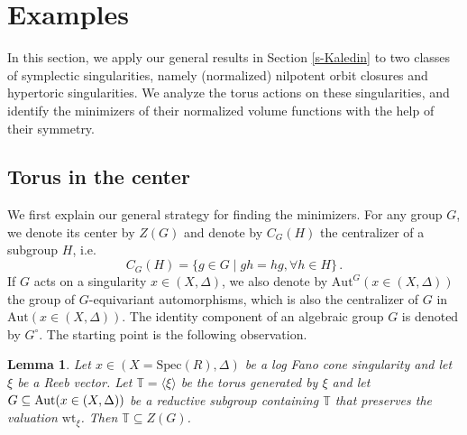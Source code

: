 \documentclass[12pt]{amsart}
\newtheorem{cor}[prop]{Corollary}
\newtheorem{lem}[prop]{Lemma}
\theoremstyle{definition}
\newcommand{\bT}{\mathbb{T}}
\newcommand{\Spec}{\mathrm{Spec}}
\newcommand{\Aut}{\mathrm{Aut}}
\newcommand{\wt}{\mathrm{wt}}
\numberwithin{equation}{section}
\begin{document}



\section{Examples}\label{s-open}

In this section, we apply our general results in Section \ref{s-Kaledin} to two classes of symplectic singularities, namely (normalized) nilpotent orbit closures and hypertoric singularities. We analyze the torus actions on these singularities, and identify the minimizers of their normalized volume functions with the help of their symmetry.

\subsection{Torus in the center}

We first explain our general strategy for finding the minimizers. For any group $G$, we denote its center by $Z(G)$ and denote by $C_G(H)$ the centralizer of a subgroup $H$, i.e. 
\[
C_G(H)=\{g\in G\mid gh=hg, \forall h\in H\}\,.
\]
If $G$ acts on a singularity $x\in (X,\Delta)$, we also denote by $\Aut^G(x\in (X,\Delta))$ the group of $G$-equivariant automorphisms, which is also the centralizer of $G$ in $\Aut(x\in (X,\Delta))$. The identity component of an algebraic group $G$ is denoted by $G^\circ$. The starting point is the following  observation. 

\begin{lem}\label{l-center}
Let $x\in (X=\Spec(R),\Delta)$ be a log Fano cone singularity and let $\xi$ be a Reeb vector. Let $\bT = \langle\xi\rangle$ be the torus generated by $\xi$ and let $G\subseteq {\rm Aut}(x\in (X,\Delta))$ be a reductive subgroup containing $\bT$ that preserves the valuation $\wt_\xi$. Then $\mathbb T \subseteq Z(G)$.
\end{lem}
\end{document}
